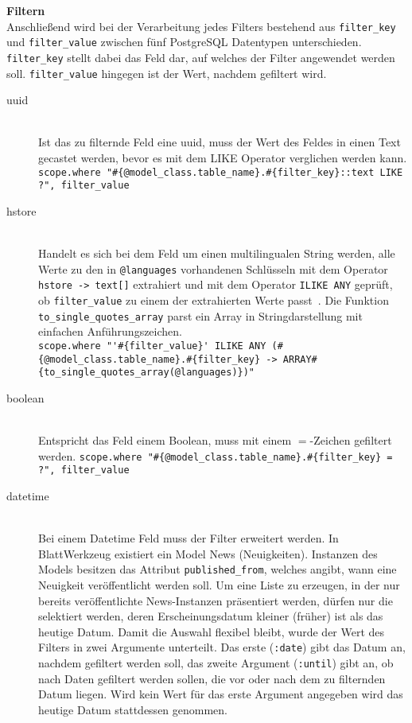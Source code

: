 \textbf{Filtern} \ \\
Anschließend wird bei der Verarbeitung jedes Filters bestehend aus \texttt{filter\_key} und \texttt{filter\_value} zwischen fünf PostgreSQL Datentypen unterschieden.
\texttt{filter\_key} stellt dabei das Feld dar, auf welches der Filter angewendet werden soll. \texttt{filter\_value} hingegen ist der Wert, nachdem gefiltert wird.


\begin{description}
	\item[uuid] \ \\
		Ist das zu filternde Feld eine uuid, muss der Wert des Feldes in einen Text gecastet werden, bevor es mit dem LIKE Operator verglichen werden kann. \\
		\lstinline|scope.where "#{@model_class.table_name}.#{filter_key}::text LIKE ?", filter_value|
	\item[hstore] \ \\
		Handelt es sich bei dem Feld um einen multilingualen String werden, alle Werte zu den in \texttt{@languages} vorhandenen Schlüsseln mit dem Operator \texttt{hstore -> text[]} extrahiert und mit dem Operator \texttt{ILIKE ANY} geprüft, ob \texttt{filter\_value} zu einem der extrahierten Werte passt~\cite{ilike-any-postgres}.
		Die Funktion \texttt{to\-\_single\-\_quotes\-\_array} parst ein Array in Stringdarstellung mit einfachen Anführungszeichen.\\
		\lstinline|scope.where "'#{filter_value}' ILIKE ANY (#{@model_class.table_name}.#{filter_key} -> ARRAY#{to_single_quotes_array(@languages)})"|
	\item[boolean] \ \\
		Entspricht das Feld einem Boolean, muss mit einem $=$-Zeichen gefiltert werden.
		\lstinline|scope.where "#{@model_class.table_name}.#{filter_key} = ?", filter_value|
	\item[datetime] \ \\
		Bei einem Datetime Feld muss der Filter erweitert werden. In BlattWerkzeug existiert ein Model News (Neuigkeiten). Instanzen des Models besitzen das Attribut \texttt{published\_from}, welches angibt, wann eine Neuigkeit veröffentlicht werden soll. Um eine Liste zu erzeugen, in der nur bereits veröffentlichte News-Instanzen präsentiert werden, dürfen nur die selektiert werden, deren Erscheinungsdatum kleiner (früher) ist als das heutige Datum. Damit die Auswahl flexibel bleibt, wurde der Wert des Filters in zwei Argumente unterteilt. Das erste (\texttt{:date}) gibt das Datum an, nachdem gefiltert werden soll, das zweite Argument (\texttt{:until}) gibt an, ob nach Daten gefiltert werden sollen, die vor oder nach dem zu filternden Datum liegen. Wird kein Wert für das erste Argument angegeben wird das heutige Datum stattdessen genommen. \\

\end{description}
